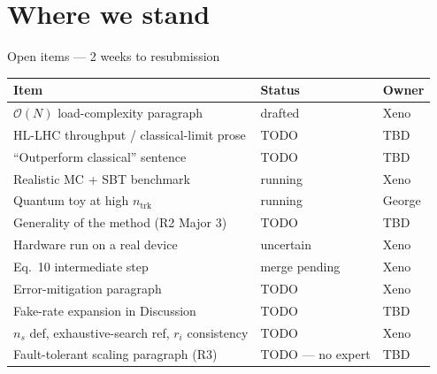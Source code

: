 \documentclass[aspectratio=169]{beamer}
\begin{document}
\section{Where we stand}

\begin{frame}{Open items --- 2 weeks to resubmission}
\footnotesize
\begin{tabular}{p{6.4cm} p{2.4cm} p{2.4cm}}
\toprule
\textbf{Item} & \textbf{Status} & \textbf{Owner} \\
\midrule
$\mathcal O(N)$ load-complexity paragraph & drafted & Xeno \\
HL-LHC throughput / classical-limit prose & TODO & TBD \\
``Outperform classical'' sentence & TODO & TBD \\
Realistic MC + SBT benchmark & running & Xeno \\
Quantum toy at high $n_{\mathrm{trk}}$ & running & George \\
Generality of the method (R2 Major 3) & TODO & TBD \\
Hardware run on a real device & uncertain & Xeno \\
Eq.\ 10 intermediate step & merge pending & Xeno \\
Error-mitigation paragraph & TODO & Xeno \\
Fake-rate expansion in Discussion & TODO & TBD \\
$n_s$ def, exhaustive-search ref, $r_i$ consistency & TODO & Xeno \\
Fault-tolerant scaling paragraph (R3) & TODO --- no expert & TBD \\
\bottomrule
\end{tabular}
\end{frame}
\end{document}
